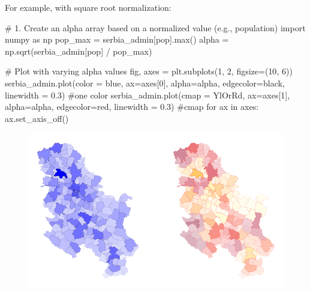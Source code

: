 \documentclass[
  letterpaper,
  DIV=11,
  numbers=noendperiod]{scrreprt}
\newenvironment{Shaded}{\begin{snugshade}}{\end{snugshade}}
\newcommand{\BuiltInTok}[1]{\textcolor[rgb]{0.00,0.23,0.31}{#1}}
\newcommand{\CommentTok}[1]{\textcolor[rgb]{0.37,0.37,0.37}{#1}}
\newcommand{\ControlFlowTok}[1]{\textcolor[rgb]{0.00,0.23,0.31}{#1}}
\newcommand{\DecValTok}[1]{\textcolor[rgb]{0.68,0.00,0.00}{#1}}
\newcommand{\FloatTok}[1]{\textcolor[rgb]{0.68,0.00,0.00}{#1}}
\newcommand{\ImportTok}[1]{\textcolor[rgb]{0.00,0.46,0.62}{#1}}
\newcommand{\KeywordTok}[1]{\textcolor[rgb]{0.00,0.23,0.31}{#1}}
\newcommand{\NormalTok}[1]{\textcolor[rgb]{0.00,0.23,0.31}{#1}}
\newcommand{\OperatorTok}[1]{\textcolor[rgb]{0.37,0.37,0.37}{#1}}
\newcommand{\StringTok}[1]{\textcolor[rgb]{0.13,0.47,0.30}{#1}}
\begin{document}
For example, with square root normalization:

\begin{Shaded}
\begin{Highlighting}[]
\CommentTok{\# 1. Create an alpha array based on a normalized value (e.g., population)}
\ImportTok{import}\NormalTok{ numpy }\ImportTok{as}\NormalTok{ np}
\NormalTok{pop\_max }\OperatorTok{=}\NormalTok{ serbia\_admin[}\StringTok{\textquotesingle{}pop\textquotesingle{}}\NormalTok{].}\BuiltInTok{max}\NormalTok{()}
\NormalTok{alpha }\OperatorTok{=}\NormalTok{ np.sqrt(serbia\_admin[}\StringTok{\textquotesingle{}pop\textquotesingle{}}\NormalTok{] }\OperatorTok{/}\NormalTok{ pop\_max) }
\end{Highlighting}
\end{Shaded}

\begin{Shaded}
\begin{Highlighting}[]
\CommentTok{\# Plot with varying alpha values}
\NormalTok{fig, axes }\OperatorTok{=}\NormalTok{ plt.subplots(}\DecValTok{1}\NormalTok{, }\DecValTok{2}\NormalTok{, figsize}\OperatorTok{=}\NormalTok{(}\DecValTok{10}\NormalTok{, }\DecValTok{6}\NormalTok{))}
\NormalTok{serbia\_admin.plot(color }\OperatorTok{=} \StringTok{\textquotesingle{}blue\textquotesingle{}}\NormalTok{, ax}\OperatorTok{=}\NormalTok{axes[}\DecValTok{0}\NormalTok{], alpha}\OperatorTok{=}\NormalTok{alpha, edgecolor}\OperatorTok{=}\StringTok{\textquotesingle{}black\textquotesingle{}}\NormalTok{, linewidth }\OperatorTok{=} \FloatTok{0.3}\NormalTok{) }\CommentTok{\#one color}
\NormalTok{serbia\_admin.plot(cmap }\OperatorTok{=} \StringTok{\textquotesingle{}YlOrRd\textquotesingle{}}\NormalTok{, ax}\OperatorTok{=}\NormalTok{axes[}\DecValTok{1}\NormalTok{], alpha}\OperatorTok{=}\NormalTok{alpha, edgecolor}\OperatorTok{=}\StringTok{\textquotesingle{}red\textquotesingle{}}\NormalTok{, linewidth }\OperatorTok{=} \FloatTok{0.3}\NormalTok{) }\CommentTok{\#cmap}
\ControlFlowTok{for}\NormalTok{ ax }\KeywordTok{in}\NormalTok{ axes:}
\NormalTok{    ax.set\_axis\_off()}
\end{Highlighting}
\end{Shaded}

\begin{figure}[H]

{\centering \includegraphics{labs/w02_maps_files/figure-pdf/cell-41-output-1.png}

}

\end{figure}
\end{document}
